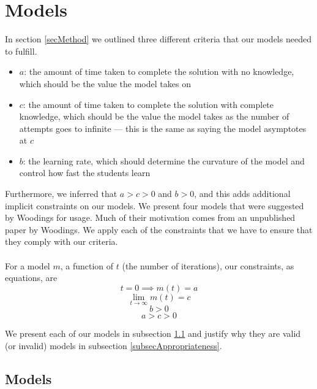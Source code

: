 \section{Models} \label{secModels}

In section \ref{secMethod} we outlined three different criteria that our models
needed to fulfill.

\begin{itemize}
  \item $a$: the amount of time taken to complete the solution with no knowledge,
  which should be the value the model takes on \AZ
  \item $c$: the amount of time taken to complete the solution with complete
  knowledge, which should be the value the model takes as the number of attempts
  goes to infinite --- this is the same as saying the model asymptotes at $c$
  \item $b$: the learning rate, which should determine the curvature of the
  model and control how fast the students learn
\end{itemize}

Furthermore, we inferred that $a > c > 0$ and $b > 0$, and this adds additional
implicit constraints on our models.
We present four models that were suggested by Woodings for usage.
Much of their motivation comes from an unpublished paper by Woodings. \FIXME
We apply each of the constraints that we have to ensure that they comply with
our criteria.\\
\\
For a model $m$, a function of $t$ (the number of iterations), our constraints, as equations, are
\begin{equation}
  t = 0 \implies m(t) = a
\end{equation}
\begin{equation}
  \lim_{t \to \infty} m(t) = c
\end{equation}
\begin{equation}
  b > 0
\end{equation}
\begin{equation}
  a > c > 0
\end{equation}

We present each of our models in subsection \ref{subsecModels} and justify why
they are valid (or invalid) models in subsection \ref{subsecAppropriateness}.

\subsection{Models} \label{subsecModels}

